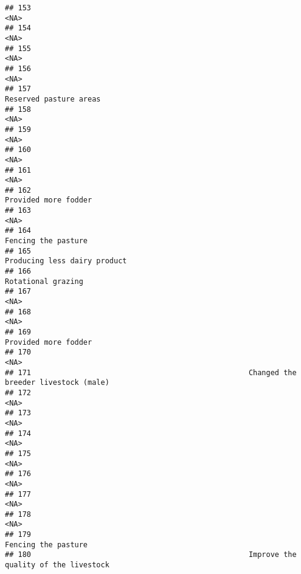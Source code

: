 \documentclass[
]{article}
\begin{document}
\begin{verbatim}
## 153                                                                                  <NA>
## 154                                                                                  <NA>
## 155                                                                                  <NA>
## 156                                                                                  <NA>
## 157                                                                Reserved pasture areas
## 158                                                                                  <NA>
## 159                                                                                  <NA>
## 160                                                                                  <NA>
## 161                                                                                  <NA>
## 162                                                                  Provided more fodder
## 163                                                                                  <NA>
## 164                                                                   Fencing the pasture
## 165                                                          Producing less dairy product
## 166                                                                    Rotational grazing
## 167                                                                                  <NA>
## 168                                                                                  <NA>
## 169                                                                  Provided more fodder
## 170                                                                                  <NA>
## 171                                                  Changed the breeder livestock (male)
## 172                                                                                  <NA>
## 173                                                                                  <NA>
## 174                                                                                  <NA>
## 175                                                                                  <NA>
## 176                                                                                  <NA>
## 177                                                                                  <NA>
## 178                                                                                  <NA>
## 179                                                                   Fencing the pasture
## 180                                                  Improve the quality of the livestock

\end{verbatim}
\end{document}
